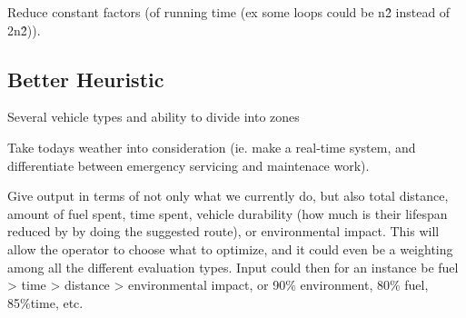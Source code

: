 Reduce constant factors (of running time (ex some loops could be n\^2 instead of 2\*n\^2)).

\subsection{Better Heuristic}
Several vehicle types and ability to divide into zones

Take todays weather into consideration (ie. make a real-time system, and differentiate between emergency servicing and maintenace work).

Give output in terms of not only what we currently do, but also total distance, amount of fuel spent, time spent, vehicle durability (how much is their lifespan reduced by by doing the suggested route), or environmental impact. This will allow the operator to choose what to optimize, and it could even be a weighting among all the different evaluation types. Input could then for an instance be fuel > time > distance > environmental impact, or 90\% environment, 80\% fuel, 85\%time, etc.

\cleardoublepage
